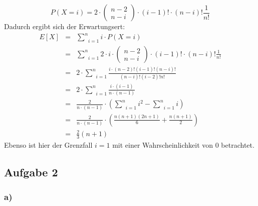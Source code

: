 \documentclass[11pt,a4paper,ngerman]{article}
\begin{document}
\begin{description}
        \[
            P(X=i) = 2 \cdot \begin{pmatrix} n - 2 \\ n-i \end{pmatrix} \cdot (i-1)! \cdot (n-i)! \frac{1}{n!}
        \]
        Dadurch ergibt sich der Erwartungsert:
        \[\begin{array}{rcl}
            E[X] &=& \underset{i=1}{\overset{n}{\sum}} i \cdot P(X=i)\\
                &=& \underset{i=1}{\overset{n}{\sum}} 2 \cdot i \cdot \begin{pmatrix} n - 2 \\ n - i \end{pmatrix} \cdot (i-1)! \cdot (n-i)! \frac{1}{n!}\\
                &=& 2 \cdot \underset{i=1}{\overset{n}{\sum}} \frac{ i \cdot (n-2)! (i-1)! (n-i)!} { (n-i)! (i - 2)!n!}\\
                &=& 2 \cdot \underset{i=1}{\overset{n}{\sum}} \frac{ i \cdot (i-1)} {n \cdot (n-1)}\\
                &=& \frac{2}{n \cdot (n-1)} \cdot \left( \underset{i=1}{\overset{n}{\sum}} i^2 - \underset{i=1}{\overset{n}{\sum}} i\right)\\
                &=& \frac{2}{n \cdot (n-1)} \cdot \left( \frac{n(n+1)(2 n+1)}{6} + \frac{n(n+1)}{2}\right)\\
                &=& \frac{2}{3} (n+1)
        \end{array}\]
        Ebenso ist hier der Grenzfall $i=1$ mit einer Wahrscheinlichkeit von $0$ betrachtet.
\end{description}

\subsection*{Aufgabe 2}

\subsubsection*{a)}
\end{document}
